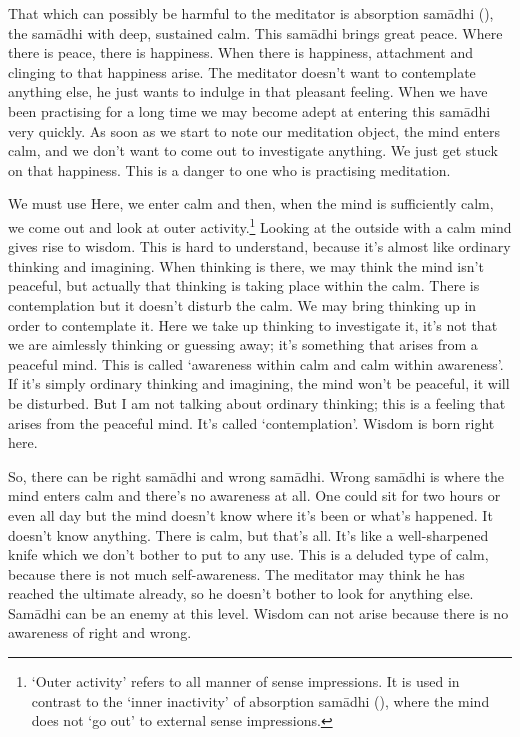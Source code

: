 That which can possibly be harmful to the meditator is absorption sam\=adhi (), the sam\=adhi with deep, sustained calm. This sam\=adhi brings great peace. Where there is peace, there is happiness. When there is happiness, attachment and clinging to that happiness arise. The meditator doesn't want to contemplate anything else, he just wants to indulge in that pleasant feeling. When we have been practising for a long time we may become adept at entering this sam\=adhi very quickly. As soon as we start to note our meditation object, the mind enters calm, and we don't want to come out to investigate anything. We just get stuck on that happiness. This is a danger to one who is practising meditation.

We must use  Here, we enter calm and then, when the mind is sufficiently calm, we come out and look at outer activity.\footnote{`Outer activity' refers to all manner of sense impressions. It is used in contrast to the `inner inactivity' of absorption sam\=adhi (), where the mind does not `go out' to external sense impressions.} Looking at the outside with a calm mind gives rise to wisdom. This is hard to understand, because it's almost like ordinary thinking and imagining. When thinking is there, we may think the mind isn't peaceful, but actually that thinking is taking place within the calm. There is contemplation but it doesn't disturb the calm. We may bring thinking up in order to contemplate it. Here we take up thinking to investigate it, it's not that we are aimlessly thinking or guessing away; it's something that arises from a peaceful mind. This is called `awareness within calm and calm within awareness'. If it's simply ordinary thinking and imagining, the mind won't be peaceful, it will be disturbed. But I am not talking about ordinary thinking; this is a feeling that arises from the peaceful mind. It's called `contemplation'. Wisdom is born right here.

So, there can be right sam\=adhi and wrong sam\=adhi. Wrong sam\=adhi is where the mind enters calm and there's no awareness at all. One could sit for two hours or even all day but the mind doesn't know where it's been or what's happened. It doesn't know anything. There is calm, but that's all. It's like a well-sharpened knife which we don't bother to put to any use. This is a deluded type of calm, because there is not much self-awareness. The meditator may think he has reached the ultimate already, so he doesn't bother to look for anything else. Sam\=adhi can be an enemy at this level. Wisdom can not arise because there is no awareness of right and wrong.

